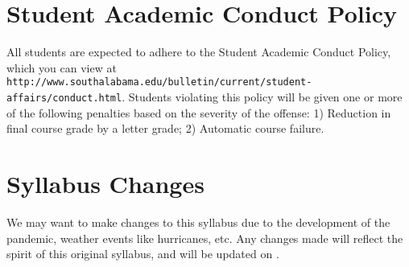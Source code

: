 \documentclass{article}
\begin{document}
\section*{\fontsize{12}{15}\selectfont Student Academic Conduct Policy}
All students are expected to adhere to the Student Academic Conduct Policy, which you can view at
{\tt http://www.southalabama.edu/bulletin/current/student-affairs/conduct.html}.  Students violating this policy will be given one or more of the following penalties based on the severity of the offense:  1) Reduction in final course grade by a letter grade; 2) Automatic course failure.


\section*{\fontsize{12}{15}\selectfont Syllabus Changes}
We may want to make changes to this syllabus due to the development of the pandemic, weather events like hurricanes, etc. Any changes made will reflect the spirit of this original syllabus, and will be updated on \LMS.
\end{document}
